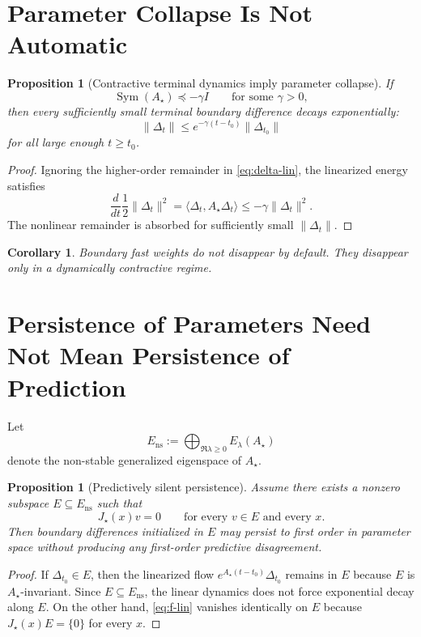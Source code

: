 \documentclass[11pt]{article}
\newcommand{\Sym}{\operatorname{Sym}}
\newtheorem{proposition}[theorem]{Proposition}
\newtheorem{corollary}[theorem]{Corollary}
\theoremstyle{remark}
\begin{document}
\section{Parameter Collapse Is Not Automatic}

\begin{proposition}[Contractive terminal dynamics imply parameter collapse]
\label{prop:parameter-collapse}
If
\[
\Sym(A_\star)\preceq -\gamma I
\qquad
\text{for some }\gamma>0,
\]
then every sufficiently small terminal boundary difference decays exponentially:
\[
\|\Delta_t\|
\le
e^{-\gamma (t-t_0)}\|\Delta_{t_0}\|
\]
for all large enough $t\ge t_0$.
\end{proposition}

\begin{proof}
Ignoring the higher-order remainder in \eqref{eq:delta-lin}, the linearized energy satisfies
\[
\frac{d}{dt}\frac12\|\Delta_t\|^2
=
\langle \Delta_t,A_\star\Delta_t\rangle
\le
-\gamma \|\Delta_t\|^2.
\]
The nonlinear remainder is absorbed for sufficiently small $\|\Delta_t\|$.
\end{proof}

\begin{corollary}
Boundary fast weights do \emph{not} disappear by default. They disappear only in a dynamically contractive regime.
\end{corollary}

\section{Persistence of Parameters Need Not Mean Persistence of Prediction}

Let
\[
E_{\mathrm{ns}}
:=
\bigoplus_{\Re \lambda \ge 0} E_\lambda(A_\star)
\]
denote the non-stable generalized eigenspace of $A_\star$.

\begin{proposition}[Predictively silent persistence]
\label{prop:silent-persistence}
Assume there exists a nonzero subspace $E\subseteq E_{\mathrm{ns}}$ such that
\[
J_\star(x) v = 0
\qquad
\text{for every }v\in E \text{ and every }x.
\]
Then boundary differences initialized in $E$ may persist to first order in parameter space without producing any first-order predictive disagreement.
\end{proposition}

\begin{proof}
If $\Delta_{t_0}\in E$, then the linearized flow $e^{A_\star (t-t_0)}\Delta_{t_0}$ remains in $E$ because $E$ is $A_\star$-invariant. Since $E\subseteq E_{\mathrm{ns}}$, the linear dynamics does not force exponential decay along $E$. On the other hand, \eqref{eq:f-lin} vanishes identically on $E$ because $J_\star(x)E=\{0\}$ for every $x$.
\end{proof}
\end{document}
